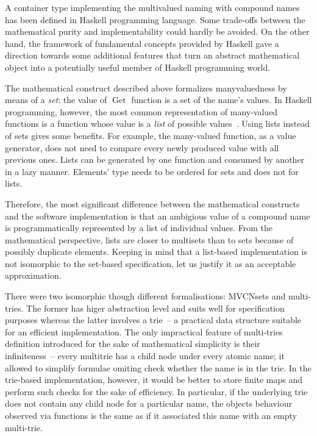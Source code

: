 \documentclass{article}
\theoremstyle{definition}
\newcommand{\deref}{\operatorname{Get}}
\begin{document}
A container type implementing the multivalued naming with compound names has
been defined in Haskell programming language. Some trade-offs between the
mathematical purity and implementability could hardly be avoided. On the other
hand, the framework of fundamental concepts provided by Haskell gave a
direction towards some additional features that turn an abstract mathematical
object into a potentially useful member of Haskell programming world.

The mathematical construct described above formalizes manyvaluedness by means
of a \emph{set}: the value of $\deref$ function is a set of the name's values.
In Haskell programming, however, the most common representation of many-valued
functions is a function whose value is a \emph{list} of possible
values~\cite[p.~285]{bib:lipovaca}.  Using lists instead of sets gives some
benefits. For example, the many-valued function, as a value generator, does not
need to compare every newly produced value with all previous ones. Lists can be
generated by one function and consumed by another in a lazy manner. Elements'
type needs to be ordered for sets and does not for lists.

Therefore, the most significant difference between the mathematical constructs
and the software implementation is that an ambigious value of a compound name is
programmatically represented by a list of individual values.  From the
mathematical perspective, lists are closer to multisets than to sets because of
possibly duplicate elements.  Keeping in mind that a list-based implementation
is not isomorphic to the set-based specification, let us justify it as an
acceptable approximation.

There were two isomorphic though different formalisations: MVCNsets and
multi-tries. The former has higer abstraction level and suits well for
specification purposes whereas the latter involves a trie~-- a practical data
structure suitable for an efficient implementation. The only impractical
feature of multi-tries definition introduced for the sake of mathematical
simplicity is their infiniteness~-- every multitrie has a child node under
every atomic name; it allowed to simplify formulae omiting check whether the
name is in the trie.  In the trie-based implementation, however, it would be
better to store finite maps and perform such checks for the sake of efficiency.
In particular, if the underlying trie does not contain any child node for a
particular name, the objects behaviour observed via functions is the same as
if it associated this name with an empty multi-trie.
\end{document}
